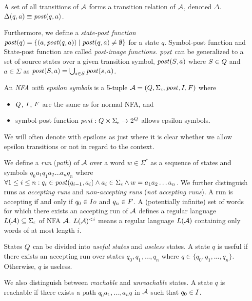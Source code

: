 A set of all transitions of $\mathcal{A}$ forms a transition relation of $\mathcal{A}$, denoted $\Delta$. $\Delta(q, a) \equiv \mathit{post}(q, a)$.

Furthermore, we define a \emph{state-post function} $\mathit{post}(q) = \{ (a, \mathit{post}(q, a)) \mid \mathit{post}(q, a) \neq \emptyset \}$ for a state $q$.
Symbol-post function and State-post function are called \emph{post-image functions}.
$\mathit{post}$ can be generalized to a set of source states over a given transition symbol, $\mathit{post}(S, a)$ where $S \in Q$ and $a \in \Sigma$ as $\mathit{post}(S, a) = \bigcup_{s \in S} \mathit{post}(s, a)$.


An \emph{NFA with epsilon symbols} is a 5-tuple $\mathcal{A} = (Q, \Sigma_\epsilon, \mathit{post}, I, F)$ where
\begin{itemize}
    \item $Q$, $I$, $F$ are the same as for normal NFA, and
    \item symbol-post function $\mathit{post}: Q \times \Sigma_\epsilon \rightarrow 2^{Q}$ allows epsilon symbols.
\end{itemize}
We will often denote \nfa with epsilons as just \nfa where it is clear whether we allow epsilon transitions or not in regard to the context.

We define a \emph{run} (\emph{path}) of $\mathcal{A}$ over a word $w \in \Sigma^*$ as a sequence of states and symbols $q_0a_1q_1a_2\ldots a_nq_n$ where $\forall 1 \leq i \leq n: q_i \in \mathit{post}(q_{i-1}, a_i) \land a_i \in \Sigma_\epsilon \land w = a_1a_2\ldots a_n$.
We further distinguish runs as \emph{accepting runs} and \emph{non-accepting runs} (\emph{not accepting runs}).
A run is accepting if and only if $q_0 \in I  o$ and $q_n \in F$.
A (potentially infinite) set of words for which there exists an accepting run of $\mathcal{A}$ defines a regular language $L(\mathcal{A}) \subseteq \Sigma_\epsilon$ of NFA $\mathcal{A}$. $L(\mathcal{A})^{<i}$ means a regular language $L(\mathcal{A})$ containing only words of at most length $i$.

States $Q$ can be divided into \emph{useful states} and \emph{useless} states.
A state $q$ is useful if there exists an accepting run over states $q_0, q_1, \ldots, q_n$ where $q \in \{ q_0, q_1, \ldots, q_n \}$.
Otherwise, $q$ is useless.

We also distinguish between \emph{reachable} and \emph{unreachable} states.
A state $q$ is reachable if there exists a path $q_0a_1, \ldots, a_nq$ in $\mathcal{A}$ such that $q_0 \in I$.

